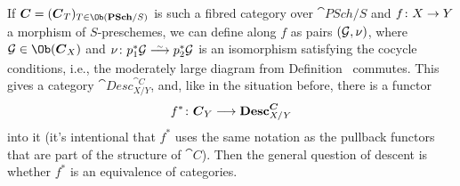 \documentclass[a4paper,parskip=half,numbers=enddot, DIV=12]{scrreprt}
\begin{document}
If $\cat C=(\cat C_T)_{T\in\Ob(\cat{PSch}/S)}$ is such a fibred category over $\cat{PSch}/S$ and $f\colon X\morphism Y$ a morphism of $S$-preschemes, we can define  along $f$ as pairs $(\mathcal{G},\nu)$, where $\Gg\in\Ob(\cat C_X)$ and $\nu\colon  p_1^*\Gg\isomorphism p_2^*\Gg$ is an isomorphism satisfying the cocycle conditions, i.e., the moderately large diagram from Definition~ commutes. This gives a category $\cat{Desc}_{X/Y}^{\cat{C}}$, and, like in the situation before, there is a functor
\begin{align*}
	f^*\colon \cat C_Y\morphism\cat{Desc}_{X/Y}^{\cat{C}}
\end{align*}
into it (it's intentional that $f^*$ uses the same notation as the pullback functors that are part of the structure of $\cat C$). Then the general question of descent is whether $f^*$ is an equivalence of categories.
\end{document}
